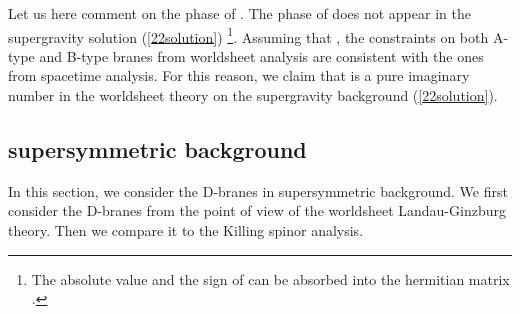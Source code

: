 \documentclass[a4paper,12pt]{article}
\numberwithin{equation}{section}
\providecommand{\jb}{\bar{\jmath}}
\providecommand{\mb}{\bar{m}}
\providecommand{\vp}{\varphi}
\begin{document}
Let us here comment on the phase of \coordHE{}. The phase of \coordHE{} does not appear in
the supergravity solution (\ref{22solution})%
\footnote{The absolute value and the sign of \coordHE{} can be absorbed 
into the hermitian matrix \myHighlight{$\vp_{i\jb}$}\coordHE{}.}.
Assuming that \myHighlight{$m=-\mb$}\coordHE{}, the constraints on
both A-type and B-type branes from worldsheet analysis
are consistent with the ones from spacetime analysis. 
For this reason, we claim that \coordHE{}
is a pure imaginary number in the worldsheet theory on the supergravity
background (\ref{22solution}).

\subsection{\coordHE{} supersymmetric background}
\label{11D-brane}

In this section, we consider the D-branes in \coordHE{} supersymmetric
background. We first consider the D-branes from the point of view of the
worldsheet Landau-Ginzburg theory. Then we compare it to the Killing spinor 
analysis. 
\end{document}
